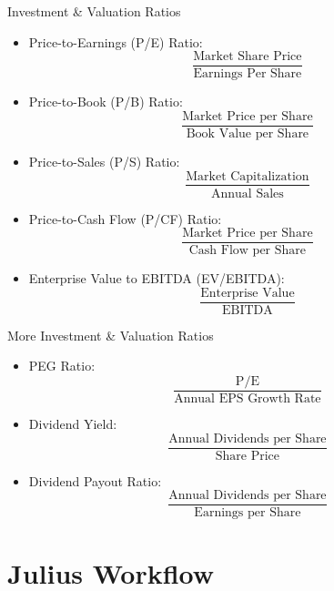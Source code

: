 \documentclass[10pt]{beamer}
\begin{document}
\begin{frame}{Investment \& Valuation Ratios}
  \begin{itemize}
    \item Price-to-Earnings (P/E) Ratio:
    \[
      \frac{\text{Market Share Price}}{\text{Earnings Per Share}}
    \]

    \item Price-to-Book (P/B) Ratio:
    \[
      \frac{\text{Market Price per Share}}{\text{Book Value per Share}}
    \]

    \item Price-to-Sales (P/S) Ratio:
    \[
      \frac{\text{Market Capitalization}}{\text{Annual Sales}}
    \]

    \item Price-to-Cash Flow (P/CF) Ratio:
    \[
      \frac{\text{Market Price per Share}}{\text{Cash Flow per Share}}
    \]

    \item Enterprise Value to EBITDA (EV/EBITDA):
    \[
      \frac{\text{Enterprise Value}}{\text{EBITDA}}
    \]
  \end{itemize}
\end{frame}

\begin{frame}{More Investment \& Valuation Ratios}
  \begin{itemize}
    \item PEG Ratio:
    \[
      \frac{\text{P/E}}{\text{Annual EPS Growth Rate}}
    \]

    \item Dividend Yield:
    \[
      \frac{\text{Annual Dividends per Share}}{\text{Share Price}}
    \]

    \item Dividend Payout Ratio:
    \[
      \frac{\text{Annual Dividends per Share}}{\text{Earnings per Share}}
    \]
  \end{itemize}
\end{frame}

\section{Julius Workflow}
\end{document}

